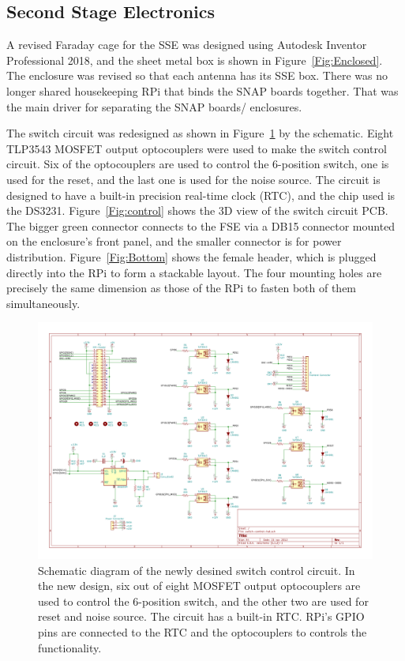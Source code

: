 \subsection{Second Stage Electronics}

A revised Faraday cage for the SSE was designed using Autodesk Inventor Professional 2018, and the sheet metal box is shown in Figure~\ref{Fig:Enclosed}. The enclosure was revised so that each antenna has its SSE box.  There was no longer shared housekeeping RPi that binds the SNAP boards together. That was the main driver for separating the SNAP boards/ enclosures.

The switch circuit was redesigned as shown in Figure~\ref{Fig:newcontrol} by the schematic. Eight TLP3543 MOSFET output optocouplers were used to make the switch control circuit. Six of the optocouplers are used to control the 6-position switch, one is used for the reset, and the last one is used for the noise source. The circuit is designed to have a built-in precision real-time clock (RTC), and the chip used is the DS3231. Figure~\ref{Fig:control} shows the 3D view of the switch circuit PCB. The bigger green connector connects to the FSE via a DB15 connector mounted on the enclosure's front panel, and the smaller connector is for power distribution. Figure~\ref{Fig:Bottom} shows the female header, which is plugged directly into the RPi to form a stackable layout. The four mounting holes are precisely the same dimension as those of the RPi to fasten both of them simultaneously.

\begin{figure}
	\centering
	\includegraphics[width=\linewidth]{"Figures/new control"}
	\caption{Schematic diagram of the newly desined switch control circuit. In the new design, six out of eight MOSFET output optocouplers are used to control the 6-position switch, and the other two are used for reset and noise source. The circuit has a built-in RTC. RPi's GPIO pins are connected to the RTC and the optocouplers to controls the functionality.}
	\label{Fig:newcontrol}
\end{figure}


